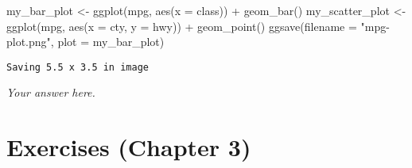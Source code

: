 \documentclass[
  letterpaper,
  DIV=11,
  numbers=noendperiod]{scrreprt}
\newenvironment{Shaded}{\begin{snugshade}}{\end{snugshade}}
\newcommand{\AttributeTok}[1]{\textcolor[rgb]{0.40,0.45,0.13}{#1}}
\newcommand{\FunctionTok}[1]{\textcolor[rgb]{0.28,0.35,0.67}{#1}}
\newcommand{\NormalTok}[1]{\textcolor[rgb]{0.00,0.23,0.31}{#1}}
\newcommand{\OtherTok}[1]{\textcolor[rgb]{0.00,0.23,0.31}{#1}}
\newcommand{\SpecialCharTok}[1]{\textcolor[rgb]{0.37,0.37,0.37}{#1}}
\newcommand{\StringTok}[1]{\textcolor[rgb]{0.13,0.47,0.30}{#1}}
\begin{document}
\begin{enumerate}
\begin{tcolorbox}
\begin{Shaded}
\begin{Highlighting}[]
\NormalTok{my\_bar\_plot }\OtherTok{\textless{}{-}} \FunctionTok{ggplot}\NormalTok{(mpg, }\FunctionTok{aes}\NormalTok{(}\AttributeTok{x =}\NormalTok{ class)) }\SpecialCharTok{+}
  \FunctionTok{geom\_bar}\NormalTok{()}
\NormalTok{my\_scatter\_plot }\OtherTok{\textless{}{-}} \FunctionTok{ggplot}\NormalTok{(mpg, }\FunctionTok{aes}\NormalTok{(}\AttributeTok{x =}\NormalTok{ cty, }\AttributeTok{y =}\NormalTok{ hwy)) }\SpecialCharTok{+}
  \FunctionTok{geom\_point}\NormalTok{()}
\FunctionTok{ggsave}\NormalTok{(}\AttributeTok{filename =} \StringTok{"mpg{-}plot.png"}\NormalTok{, }\AttributeTok{plot =}\NormalTok{ my\_bar\_plot)}
\end{Highlighting}
\end{Shaded}

\begin{verbatim}
Saving 5.5 x 3.5 in image
\end{verbatim}

  \emph{Your answer here.}

  \end{tcolorbox}
\end{enumerate}


\hypertarget{exercises-chapter-3}{%
\chapter{Exercises (Chapter 3)}\label{exercises-chapter-3}}
\end{document}
